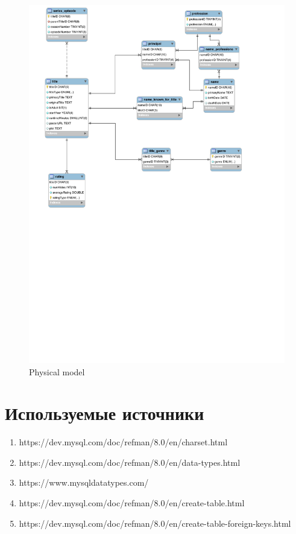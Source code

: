 \documentclass[12pt,a4paper]{article}
\begin{document}
\begin{figure}[ht]
  \includegraphics[width=\linewidth]{images/Lab2/physical_model.jpg}
  \caption{Physical model}
  \label{fig:Physical model}
\end{figure}
\section{Используемые источники}
\begin{enumerate}
    \item https://dev.mysql.com/doc/refman/8.0/en/charset.html
    \item https://dev.mysql.com/doc/refman/8.0/en/data-types.html
    \item https://www.mysqldatatypes.com/
    \item https://dev.mysql.com/doc/refman/8.0/en/create-table.html
    \item https://dev.mysql.com/doc/refman/8.0/en/create-table-foreign-keys.html
\end{enumerate}
\end{document}

